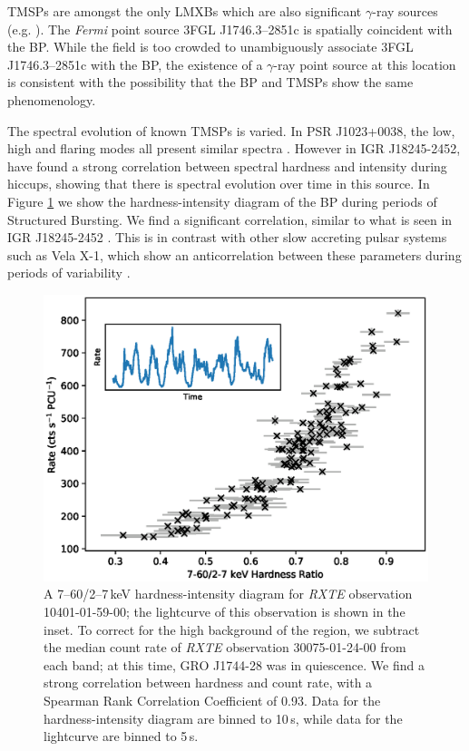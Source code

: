 \par TMSPs are amongst the only LMXBs which are also significant $\gamma$-ray sources (e.g. \citealp{Hill_XSS}). The \textit{Fermi} point source 3FGL J1746.3--2851c is spatially coincident with the BP. While the field is too crowded to unambiguously associate 3FGL J1746.3--2851c with the BP, the existence of a $\gamma$-ray point source at this location is consistent with the possibility that the BP and TMSPs show the same phenomenology.

\par The spectral evolution of known TMSPs is varied. In PSR J1023+0038, the low, high and flaring modes all present similar spectra \citep{Bogdanov_TMSPVar}. However in IGR J18245-2452, \citealp{Ferrigno_TMSPVar} have found a strong correlation between spectral hardness and intensity during hiccups, showing that there is spectral evolution over time in this source. In Figure \ref{fig:HR} we show the hardness-intensity diagram of the BP during periods of Structured Bursting. We find a significant correlation, similar to what is seen in IGR J18245-2452 \citep{Ferrigno_TMSPVar}. This is in contrast with other slow accreting pulsar systems such as Vela X-1, which show an anticorrelation between these parameters during periods of variability \citep{Kreykenbohm_Vela}.


\begin{figure}
 \centering
 \includegraphics[width=.82\linewidth, trim={0.6cm 0.1cm 1.0cm 1.1cm},clip]{images/hr.eps}
 \caption[A 7--60/2--7\,keV hardness-intensity diagram for \textit{RXTE} observation 10401-01-59-00 of the Bursting Pulsar.]{A 7--60/2--7\,keV hardness-intensity diagram for \textit{RXTE} observation 10401-01-59-00; the lightcurve of this observation is shown in the inset. To correct for the high background of the region, we subtract the median count rate of \textit{RXTE} observation 30075-01-24-00 from each band; at this time, GRO J1744-28 was in quiescence. We find a strong correlation between hardness and count rate, with a Spearman Rank Correlation Coefficient of 0.93. Data for the hardness-intensity diagram are binned to 10\,s, while data for the lightcurve are binned to 5\,s.}
 \label{fig:HR}
\end{figure}

